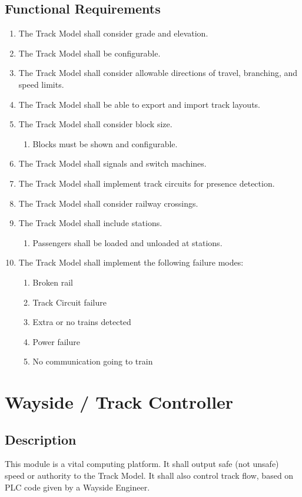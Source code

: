 \documentclass{scrreprt}
\begin{document}
\subsection{Functional Requirements}
\begin{enumerate}
    \item The Track Model shall consider grade and elevation.
    \item The Track Model shall be configurable.
    \item The Track Model shall consider allowable directions of travel, branching, and speed limits.
    \item The Track Model shall be able to export and import track layouts.
    \item The Track Model shall consider block size.
    \begin{enumerate}
        \item Blocks must be shown and configurable.
    \end{enumerate}
    \item The Track Model shall signals and switch machines.
    \item The Track Model shall implement track circuits for presence detection.
    \item The Track Model shall consider railway crossings.
    \item The Track Model shall include stations.
    \begin{enumerate}
        \item Passengers shall be loaded and unloaded at stations.
    \end{enumerate}
    \item The Track Model shall implement the following failure modes:
    \begin{enumerate}
        \item Broken rail
        \item Track Circuit failure
        \item Extra or no trains detected
        \item Power failure
        \item No communication going to train
    \end{enumerate}
\end{enumerate}

\section{Wayside / Track Controller}

\subsection{Description}
This module is a vital computing platform.
It shall output safe (not unsafe) speed or authority to the Track Model.
It shall also control track flow, based on PLC code given by a Wayside Engineer.
\end{document}
